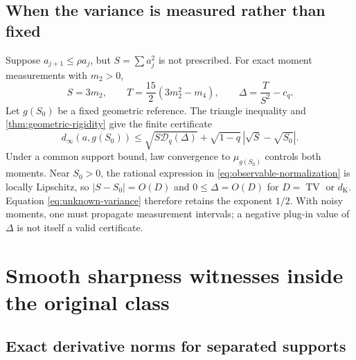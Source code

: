 \documentclass[11pt,a4paper]{article}
\numberwithin{equation}{section}
\theoremstyle{definition}
\theoremstyle{remark}
\DeclareMathOperator{\TV}{TV}
\newcommand{\dK}{d_{\mathrm K}}
\begin{document}
\subsection{When the variance is measured rather than fixed}

Suppose $a_{j+1}\le\rho a_j$, but $S=\sum a_j^2$ is not prescribed.
For exact moment measurements with $m_2>0$,
\begin{equation}
 S=3m_2,\qquad T=\frac{15}{2}(3m_2^2-m_4),\qquad
 \Delta=\frac{T}{S^2}-c_q.
 \label{eq:observable-normalization}
\end{equation}
Let $g(S_0)$ be a fixed geometric reference. The triangle inequality and
\cref{thm:geometric-rigidity} give the finite certificate
\begin{equation}
 d_\infty(a,g(S_0))\le
 \sqrt{S\mathcal D_q(\Delta)}
 +\sqrt{1-q}\,|\sqrt S-\sqrt{S_0}|.
 \label{eq:unknown-variance}
\end{equation}
Under a common support bound, law convergence to $\mu_{g(S_0)}$ controls
both moments. Near $S_0>0$, the rational expression in
\eqref{eq:observable-normalization} is locally Lipschitz, so
$|S-S_0|=O(D)$ and $0\le\Delta=O(D)$ for $D=\TV$ or $\dK$.
Equation \eqref{eq:unknown-variance} therefore retains the exponent $1/2$.
With noisy moments, one must propagate measurement intervals; a negative
plug-in value of $\Delta$ is not itself a valid certificate.

\section{Smooth sharpness witnesses inside the original class}
\label{sec:witnesses}

\subsection{Exact derivative norms for separated supports}
\end{document}
